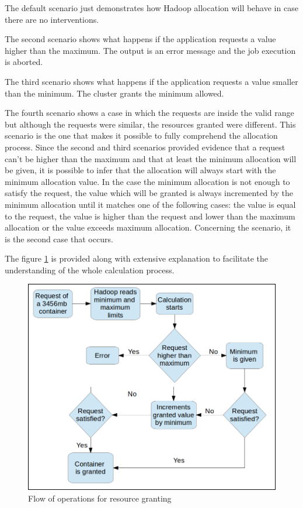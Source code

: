 The default scenario just demonstrates how Hadoop allocation will behave in case there are no interventions.

The second scenario shows what happens if the application requests a value higher than the maximum. The output is an error message and the job execution is aborted.

The third scenario shows what happens if the application requests a value smaller than the minimum. The cluster grants the minimum allowed.

The fourth scenario shows a case in which the requests are inside the valid range but although the requests were similar, the resources granted were different. This scenario is the one that makes it possible to fully comprehend the allocation process. Since the second and third scenarios provided evidence that a request can't be higher than the maximum and that at least the minimum allocation will be given, it is possible to infer that the allocation will always start with the minimum allocation value. In the case the minimum allocation is not enough to satisfy the request, the value which will be granted is always incremented by the minimum allocation until it matches one of the following cases: the value is equal to the request, the value is higher than the request and lower than the maximum allocation or the value exceeds maximum allocation. Concerning the scenario, it is the second case that occurs.

The figure \ref{fig:fluxoAllocation2} is provided along with extensive explanation to facilitate the understanding of the whole calculation process. 

\begin{figure}[!hbtn]
   \renewcommand{\figurename}{Figure}
   \centering
   \includegraphics[width=15cm]{figuras/Figura19-allocflow2.png}
   \caption{Flow of operations for resource granting}
   \label{fig:fluxoAllocation2}
\end{figure}

